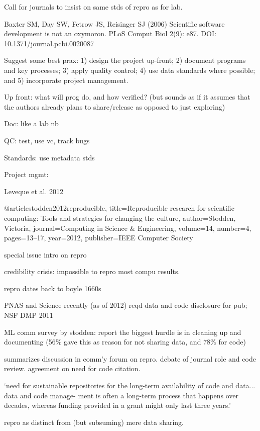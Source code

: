 \documentclass[12pt]{amsart}
\begin{document}
Call for journals to insist on same stds of repro as for lab.



Baxter SM, Day SW, Fetrow JS, Reisinger SJ (2006) Scientific software development is not an oxymoron. PLoS Comput Biol 2(9): e87. DOI: 10.1371/journal.pcbi.0020087

Suggest some best prax: 1) design the project up-front; 2) document programs and key processes; 3) apply quality control; 4) use data standards where possible; and 5) incorporate project management.

Up front: what will prog do, and how verified? (but sounds as if it assumes that the authors already plans to share/release as opposed to just exploring)

Doc: like a lab nb

QC: test, use vc, track bugs

Standards: use metadata stds

Project mgmt: 




Leveque et al. 2012

@article{stodden2012reproducible,
  title={Reproducible research for scientific computing: Tools and strategies for changing the culture},
  author={Stodden, Victoria},
  journal={Computing in Science \& Engineering},
  volume={14},
  number={4},
  pages={13--17},
  year={2012},
  publisher={IEEE Computer Society}
}

special issue intro on repro

credibility crisis: impossible to repro most compu results.

repro dates back to boyle 1660s

PNAS and Science recently (as of 2012) reqd data and code disclosure for pub; NSF DMP 2011

ML comm survey by stodden: report the biggest hurdle is in cleaning up and documenting (56\% gave this as reason for not sharing data, and 78\% for code)

summarizes discussion in comm'y forum on repro. debate of journal role and code review. agreement on need for code citation.

`need for sustainable repositories for the long-term availability of code and data...  data and code manage- ment is often a long-term process that happens over decades, whereas funding provided in a grant might only last three years.'

repro as distinct from (but subsuming) mere data sharing.
\end{document}
